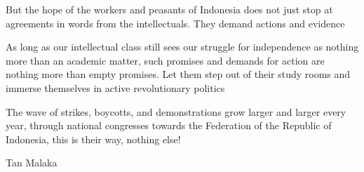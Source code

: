 But the hope of the workers and peasants of Indonesia does not just stop at agreements in words from the intellectuals. 
They demand actions and evidence\nline

As long as our intellectual class still sees our struggle for independence as nothing more than an academic matter, 
such promises and demands for action are nothing more than empty promises. Let them step out of their study rooms and immerse themselves in active revolutionary politics\nline

The wave of strikes, boycotts, and demonstrations grow larger and larger every year, through national congresses 
towards the Federation of the Republic of Indonesia, this is their way, nothing else!\nline

\begin{flushright}
    Tan Malaka
\end{flushright}
